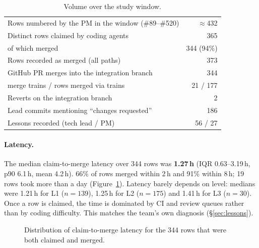 \documentclass[11pt]{article}
\begin{document}
\begin{table}[h]
\centering\small
\begin{tabular}{@{}lr@{}}
\toprule
Rows numbered by the PM in the window (\#89--\#520) & $\approx$432 \\
Distinct rows claimed by coding agents & 365 \\
\quad of which merged & 344 (94\%) \\
Rows recorded as merged (all paths) & 373 \\
GitHub PR merges into the integration branch & 344 \\
\quad merge trains / rows merged via trains & 21 / 177 \\
Reverts on the integration branch & 2 \\
Lead commits mentioning ``changes requested'' & 186 \\
Lessons recorded (tech lead / PM) & 56 / 27 \\
\bottomrule
\end{tabular}
\caption{Volume over the study window.}\label{tab:volume}
\end{table}

\paragraph{Latency.} The median claim-to-merge latency over 344 rows was
\textbf{1.27\,h} (IQR 0.63--3.19\,h, p90 6.1\,h, mean 4.2\,h). 66\% of rows
merged within 2\,h and 91\% within 8\,h; 19 rows took more than a day
(Figure~\ref{fig:latency}). Latency barely depends on level: medians were
1.21\,h for L1 ($n{=}139$), 1.25\,h for L2 ($n{=}175$) and 1.41\,h for L3
($n{=}30$). Once a row is claimed, the time is dominated by CI and review
queues rather than by coding difficulty. This matches the team's own diagnosis
(\S\ref{sec:lessons}).

\begin{figure}[h]
\centering
{}
\caption{Distribution of claim-to-merge latency for the 344 rows that were both claimed and merged.}
\label{fig:latency}
\end{figure}
\end{document}
